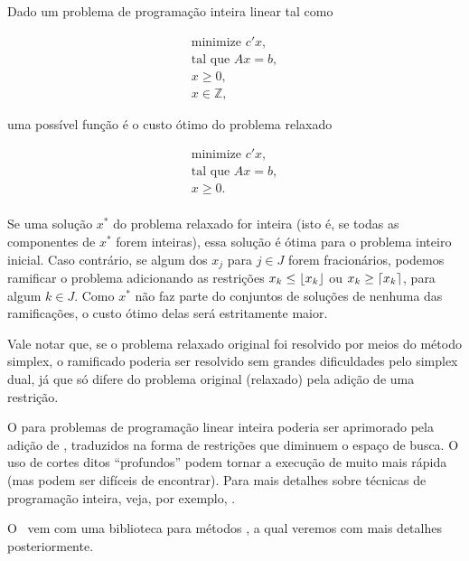 \documentclass{article}
\begin{document}
Dado um problema de programação inteira linear tal como

\begin{equation}
  \begin{split}
    \text{minimize } c'x, \\
    \text{tal que }  Ax = b,\\
             x \geq 0,\\
             x \in \mathbb{Z},
  \end{split}\label{eq:inteiro}
\end{equation}

\noindent uma possível função  é o custo ótimo do problema relaxado

\begin{equation}
  \begin{split}
    \text{minimize } c'x, \\
    \text{tal que }  Ax = b,\\
             x \geq 0.\\
  \end{split}\label{eq:inteiro}
\end{equation}

Se uma solução $x^*$ do problema relaxado for inteira (isto é, se todas as componentes de $x^*$ forem
inteiras), essa solução é ótima para o problema inteiro inicial. Caso contrário, se algum dos $x_j$ para $j
\in J$ forem fracionários, podemos ramificar o problema adicionando as restrições $x_k \leq
\floor*{x_k}$ ou $x_k \geq \ceil*{x_k}$, para algum $k \in J$. Como $x^*$ não faz parte do
conjuntos de soluções de nenhuma das ramificações, o custo ótimo delas será estritamente maior.

Vale notar que, se o problema relaxado original foi resolvido por meios do método simplex, o
ramificado poderia ser resolvido sem grandes dificuldades pelo simplex dual, já que só difere do
problema original (relaxado) pela adição de uma restrição.

O  para problemas de programação linear inteira poderia ser aprimorado
pela adição de , traduzidos na forma de restrições que diminuem o espaço
de busca. O uso de cortes ditos ``profundos'' podem tornar a execução de  muito mais rápida (mas podem ser difíceis de encontrar). Para mais detalhes sobre técnicas
de programação inteira, veja, por exemplo, \cite{tsitsiklis}.

O \eclipse\ vem com uma biblioteca para métodos , a qual veremos com mais
detalhes posteriormente.
\end{document}
